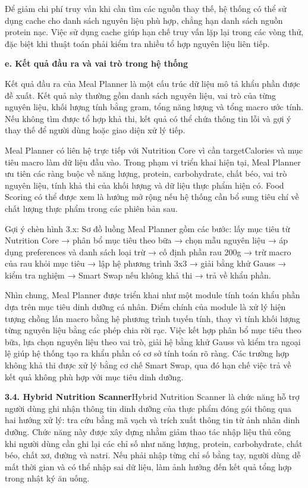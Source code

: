 Để giảm chi phí truy vấn khi cần tìm các nguồn thay thế, hệ thống có thể sử dụng cache cho danh sách nguyên liệu phù hợp, chẳng hạn danh sách nguồn protein nạc. Việc sử dụng cache giúp hạn chế truy vấn lặp lại trong các vòng thử, đặc biệt khi thuật toán phải kiểm tra nhiều tổ hợp nguyên liệu liên tiếp.

\textbf{e. Kết quả đầu ra và vai trò trong hệ thống}

Kết quả đầu ra của Meal Planner là một cấu trúc dữ liệu mô tả khẩu phần được đề xuất. Kết quả này thường gồm danh sách nguyên liệu, vai trò của từng nguyên liệu, khối lượng tính bằng gram, tổng năng lượng và tổng macro ước tính. Nếu không tìm được tổ hợp khả thi, kết quả có thể chứa thông tin lỗi và gợi ý thay thế để người dùng hoặc giao diện xử lý tiếp.

Meal Planner có liên hệ trực tiếp với Nutrition Core vì cần targetCalories và mục tiêu macro làm dữ liệu đầu vào. Trong phạm vi triển khai hiện tại, Meal Planner ưu tiên các ràng buộc về năng lượng, protein, carbohydrate, chất béo, vai trò nguyên liệu, tính khả thi của khối lượng và dữ liệu thực phẩm hiện có. Food Scoring có thể được xem là hướng mở rộng nếu hệ thống cần bổ sung tiêu chí về chất lượng thực phẩm trong các phiên bản sau.

Gợi ý chèn hình 3.x: Sơ đồ luồng Meal Planner gồm các bước: lấy mục tiêu từ Nutrition Core → phân bổ mục tiêu theo bữa → chọn mẫu nguyên liệu → áp dụng preferences và danh sách loại trừ → cố định phần rau 200g → trừ macro của rau khỏi mục tiêu → lập hệ phương trình 3x3 → giải bằng khử Gauss → kiểm tra nghiệm → Smart Swap nếu không khả thi → trả về khẩu phần.

Nhìn chung, Meal Planner được triển khai như một module tính toán khẩu phần dựa trên mục tiêu dinh dưỡng cá nhân. Điểm chính của module là xử lý hiện tượng chồng lấn macro bằng hệ phương trình tuyến tính, thay vì tính khối lượng từng nguyên liệu bằng các phép chia rời rạc. Việc kết hợp phân bổ mục tiêu theo bữa, lựa chọn nguyên liệu theo vai trò, giải hệ bằng khử Gauss và kiểm tra ngoại lệ giúp hệ thống tạo ra khẩu phần có cơ sở tính toán rõ ràng. Các trường hợp không khả thi được xử lý bằng cơ chế Smart Swap, qua đó hạn chế việc trả về kết quả không phù hợp với mục tiêu dinh dưỡng.

\textbf{3.4. Hybrid Nutrition Scanner}Hybrid Nutrition Scanner là chức năng hỗ trợ người dùng ghi nhận thông tin dinh dưỡng của thực phẩm đóng gói thông qua hai hướng xử lý: tra cứu bằng mã vạch và trích xuất thông tin từ ảnh nhãn dinh dưỡng. Chức năng này được xây dựng nhằm giảm thao tác nhập liệu thủ công khi người dùng cần ghi lại các chỉ số như năng lượng, protein, carbohydrate, chất béo, chất xơ, đường và natri. Nếu phải nhập từng chỉ số bằng tay, người dùng dễ mất thời gian và có thể nhập sai dữ liệu, làm ảnh hưởng đến kết quả tổng hợp trong nhật ký ăn uống.


